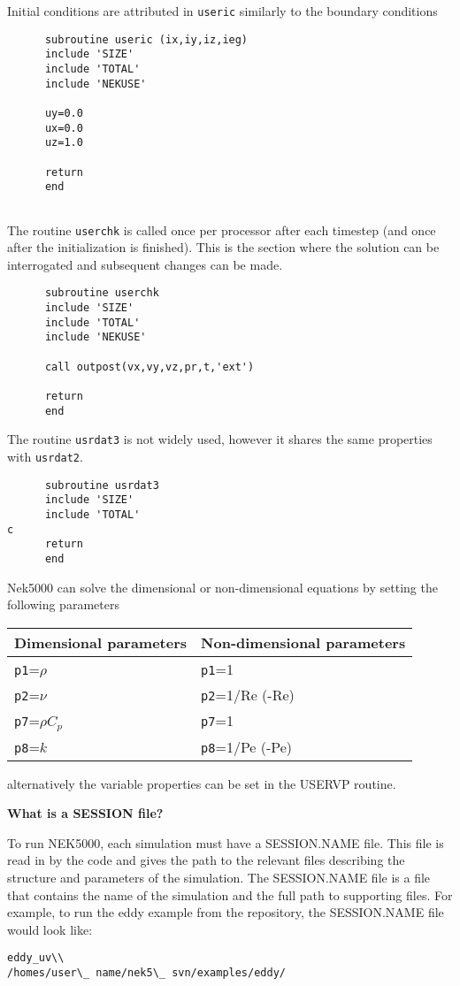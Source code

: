 Initial conditions are attributed in {\tt useric} similarly to the boundary conditions
\begin{lstlisting}
      subroutine useric (ix,iy,iz,ieg)
      include 'SIZE'
      include 'TOTAL'
      include 'NEKUSE'
   
      uy=0.0
      ux=0.0
      uz=1.0

      return
      end
      
\end{lstlisting}
The routine {\tt userchk} is called once per processor after each timestep (and once after the initialization is finished). This is the section where the solution can be interrogated and subsequent changes can be made.
\begin{lstlisting}
      subroutine userchk
      include 'SIZE'
      include 'TOTAL'
      include 'NEKUSE'

      call outpost(vx,vy,vz,pr,t,'ext')
           
      return
      end
      \end{lstlisting}
      
The routine {\tt usrdat3} is not widely used, however it shares the same properties with {\tt usrdat2}.
\begin{lstlisting}
      subroutine usrdat3
      include 'SIZE'
      include 'TOTAL'
c
      return
      end
\end{lstlisting}

Nek5000 can solve the dimensional or non-dimensional equations by setting the following parameters

\begin{table}

\begin{tabular}{ l|l| }
   \hline
   Dimensional parameters & Non-dimensional parameters\\ \hline \hline
{\tt p1}=$\rho$      &      {\tt p1}=1\\
{\tt p2}=$\nu$       &      {\tt p2}=1/Re (-Re)\\
{\tt p7}=$\rho C_p$  &      {\tt p7}=1\\
{\tt p8}=$k$         &      {\tt p8}=1/Pe (-Pe)\\
   \hline
\end{tabular}
\end{table}

alternatively the variable properties can be set in the USERVP routine.

 
\textbf{What is a SESSION file?}

To run NEK5000, each simulation must have a SESSION.NAME file. This file is read in by the code and gives the path to the relevant files describing the structure and parameters of the simulation. The SESSION.NAME file is a file that contains the name of the simulation and the full path to supporting files. For example, to run the eddy example from the repository, the SESSION.NAME file would look like:

\begin{verbatim}
eddy_uv\\
/homes/user\_ name/nek5\_ svn/examples/eddy/ 
\end{verbatim}

